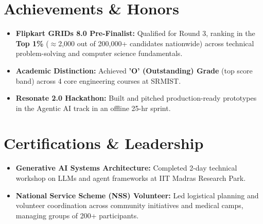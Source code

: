 \documentclass[letterpaper,10pt]{article}
\newcommand{\resumeItem}[1]{
  \item\small{
    {#1 \vspace{-2pt}}
  }
}
\newcommand{\resumeSubHeadingListStart}{\begin{itemize}[leftmargin=0.0in, label={}]}
\newcommand{\resumeSubHeadingListEnd}{\end{itemize}}
\newcommand{\resumeItemListStart}{\begin{itemize}[leftmargin=0.15in, label=\raisebox{0.15ex}{\tiny$\bullet$}, itemsep=1.5pt]}
\newcommand{\resumeItemListEnd}{\end{itemize}\vspace{-3pt}}
\begin{document}
\section{Achievements \& Honors}
    \resumeSubHeadingListStart
        \resumeItemListStart
            \resumeItem{\textbf{Flipkart GRIDs 8.0 Pre-Finalist:} Qualified for Round 3, ranking in the \textbf{Top 1\%} ($\approx$2,000 out of 200,000+ candidates nationwide) across technical problem-solving and computer science fundamentals.}
            \resumeItem{\textbf{Academic Distinction:} Achieved \textbf{'O' (Outstanding) Grade} (top score band) across 4 core engineering courses at SRMIST.}
            \resumeItem{\textbf{Resonate 2.0 Hackathon:} Built and pitched production-ready prototypes in the Agentic AI track in an offline 25-hr sprint.}
        \resumeItemListEnd
    \resumeSubHeadingListEnd

\section{Certifications \& Leadership}
    \resumeSubHeadingListStart
        \resumeItemListStart
            \resumeItem{\textbf{Generative AI Systems Architecture:} Completed 2-day technical workshop on LLMs and agent frameworks at IIT Madras Research Park.}
            \resumeItem{\textbf{National Service Scheme (NSS) Volunteer:} Led logistical planning and volunteer coordination across community initiatives and medical camps, managing groups of 200+ participants.}
        \resumeItemListEnd
    \resumeSubHeadingListEnd
\end{document}
